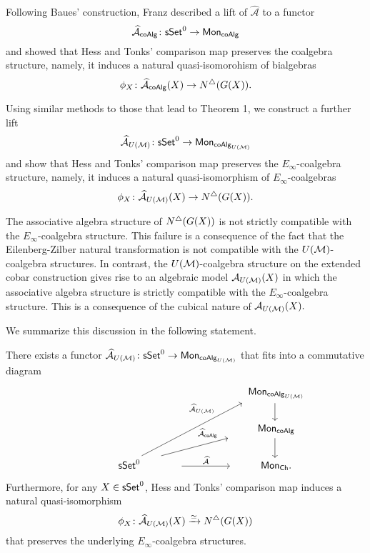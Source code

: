 Following Baues’ construction, Franz described a lift of $\widehat{\mathcal{A}}$ to a functor
$$\widehat{\mathcal{A}}_{\mathsf{coAlg}} \colon \mathsf{sSet}^0 \to \mathsf{Mon}_{\mathsf{coAlg}}$$ and showed that Hess and Tonks' comparison map preserves the coalgebra structure, namely, it induces a natural quasi-isomorohism of bialgebras
$$\phi_X \colon \widehat{\mathcal{A}}_{\mathsf{coAlg}}(X) \to N^{\triangle} (G(X)).$$

Using similar methods to those that lead to Theorem 1, we construct a further lift
$$\widehat{\mathcal{A}}_{U(\mathcal{M})} \colon \mathsf{sSet}^0 \to \mathsf{Mon}_{\mathsf{coAlg}_{U(\mathcal{M})}}$$
and show that Hess and Tonks' comparison map preserves the $E_{\infty}$-coalgebra structure, namely, it induces a natural quasi-isomorphism of $E_{\infty}$-coalgebras
$$\phi_X \colon  \widehat{\mathcal{A}}_{U(\mathcal{M})}(X) \to N^{\triangle}(G(X)).$$

The associative algebra structure of $N^{\triangle}(G(X))$ is not strictly compatible with the $E_{\infty}$-coalgebra structure. This failure is a consequence of the fact that the Eilenberg-Zilber natural transformation is not compatible with the $U(\mathcal{M})$-coalgebra structures. In contrast, the $U(\mathcal{M})$-coalgebra structure on the extended cobar construction gives rise to an algebraic model $\mathcal{A}_{U(\mathcal{M})}(X)$ in which the associative algebra structure is strictly compatible with the $E_{\infty}$-coalgebra structure. This is a consequence of the cubical nature of  $\mathcal{A}_{U(\mathcal{M})}(X).$ 


We summarize this discussion in the following statement.

\begin{theorem} There exists a functor $\widehat{\mathcal{A}}_{U(\mathcal{M})} \colon \mathsf{sSet}^0 \to \mathsf{Mon}_{\mathsf{coAlg}_{U(\mathcal{M})}}$ that fits into a commutative diagram
\begin{equation*}
\begin{tikzcd}[column sep=large]
& \phantom{aaaaa}\Mon_{\coAlg_{U(\M)}} \arrow[d, shift left=5, ""]\\
& \phantom{aaaaa}\Mon_{\coAlg} \ar[d, shift left=5, ""]\\
\phantom{sssssssssss}\sSet^0 \phantom{aaaaaaa} \ar[r, "\widehat{\mathcal{A}}", ]\ar[ru, "\widehat{\mathcal{A}}_{\coAlg}", very near end]\arrow[ruu,  "\widehat{\mathcal{A}}_{U(\M)}", near end] & \phantom{aaaaa} \Mon_{\Ch}.
\end{tikzcd}
\end{equation*}
Furthermore, for any $X \in \mathsf{sSet}^0$, Hess and Tonks' comparison map induces a natural quasi-isomorphism 
$$ \phi_X \colon \widehat{\mathcal{A}}_{U(\mathcal{M})}(X) \xrightarrow{\simeq} N^{\triangle}(G(X))$$ that preserves the underlying $E_{\infty}$-coalgebra structures.
\end{theorem}


